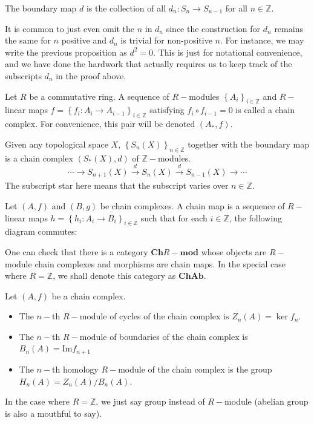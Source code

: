 \documentclass[12pt,reqno]{amsart}
\numberwithin{theorem}{section}
\theoremstyle{definition}
\theoremstyle{remark}
\numberwithin{equation}{section}
\newcommand{\Z}{\mathbb Z}
\newcommand{\set}[1]{\left \{ #1 \right \}}
\renewcommand{\Im}{\text{Im}}
\theoremstyle{definition}
\begin{document}
\begin{definition}
    The boundary map $d$ is the collection of all $d_n:S_n\rightarrow S_{n-1}$ for all $n \in \Z$. 
\end{definition}
It is common to just even omit the $n$ in $d_n$ since the construction for $d_n$ remains the same for $n$ positive and $d_n$ is trivial for non-positive $n$. For instance, we may write the previous proposition as $d^2=0$. This is just for notational convenience, and we have done the hardwork that actually requires us to keep track of the subscripts $d_n$ in the proof above. 
\begin{definition}
    Let $R$ be a commutative ring. A sequence of $R-$modules $\set{A_i}_{i \in \Z}$ and $R-$linear maps $f=\set{f_i:A_i \rightarrow A_{i-1}}_{i \in \Z}$ satisfying $f_i\circ f_{i-1} = 0$ is called a chain complex. For convenience, this pair will be denoted $(A_*,f)$.
\end{definition}
\begin{example}
    Given any topological space $X$, $\set{S_n(X)}_{n \in \Z}$ together with the boundary map is a chain complex $(S_*(X),d)$ of $\Z-$modules.
    $$\cdots\rightarrow S_{n+1}(X)\xrightarrow[]{d}S_n(X)\xrightarrow[]{d}S_{n-1}(X)\rightarrow \cdots$$
    The subscript star here means that the subscript varies over $n \in \mathbb Z$.
\end{example}
\begin{definition}
    Let $(A,f)$ and $(B,g)$ be chain complexes. A chain map is a sequence of $R-$linear maps $h=\set{h_i:A_i\rightarrow B_i}_{i \in \Z}$ such that for each $i \in \Z$, the following diagram commutes:
    \begin{center}
    \end{center}
\end{definition}
One can check that there is a category $\mathbf{Ch}R-\mathbf{mod}$ whose objects are $R-$module chain complexes and morphisms are chain maps. In the special case where $R=\Z$, we shall denote this category as $\mathbf{ChAb}$.
\begin{definition}
    Let $(A,f)$ be a chain complex. 
    \begin{itemize}
        \item The $n-$th $R-$module of cycles of the chain complex is $Z_n(A)=\ker f_n$.
        \item The $n-$th $R-$module of boundaries of the chain complex is $B_n(A) = \Im f_{n+1}$
        \item The $n-$th homology $R-$module of the chain complex is the group $H_n(A)=Z_n(A)/B_n(A)$.
    \end{itemize}
    In the case where $R=\Z$, we just say group instead of $R-$module (abelian group is also a mouthful to say).
\end{definition}
\end{document}
